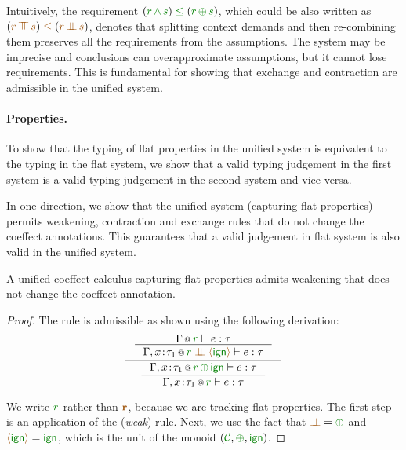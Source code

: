 \noindent
Intuitively, the requirement $(\cclrd{r}\,\czip\,\cclrd{s}) \;\cleq\; (\cclrd{r}\,\cpar\,\cclrd{s})$,
which could be also written as $(\aclrd{r}\,\azip\,\aclrd{s}) \;\aclrd{\leq}\; (\aclrd{r}\,\apar\,\aclrd{s})$,
denotes that splitting context demands and then re-combining them preserves all the requirements
from the assumptions. The system may be imprecise and conclusions can overapproximate assumptions, but
it cannot lose requirements. This is fundamental for showing that exchange and contraction are admissible
in the unified system.

\paragraph{Properties.}
To show that the typing of flat properties in the unified system is equivalent to the typing in the
flat system, we show that a valid typing judgement in the first system is a valid typing judgement in
the second system and vice versa.

In one direction, we show that the unified system (capturing flat properties) permits weakening,
contraction and exchange rules that do not change the coeffect annotations. This guarantees that
a valid judgement in flat system is also valid in the unified system.

\begin{lemma}
\label{thm:further-weak}
A unified coeffect calculus capturing flat properties admits weakening that does not change the
coeffect annotation.
\end{lemma}
\begin{proof}
The rule is admissible as shown using the following derivation:
\begin{equation*}
\inference
  { \inference
      {\coctx{\Gamma}{ \cclrd{r} } \vdash e : \tau}
      {\coctx{\Gamma,x \!:\! \tau_1}{\cclrd{r} \;\apar\; \alift{ \czero }} \vdash e : \tau} }
  { \inference
      {\coctx{\Gamma,x \!:\! \tau_1}{\cclrd{r} \,\cpar\, \czero} \vdash e : \tau}
      {\coctx{\Gamma,x \!:\! \tau_1}{\cclrd{r}} \vdash e : \tau} }
\end{equation*}

\noindent
We write $\cclrd{r}$ rather than $\aclrd{\textbf{r}}$, because we are tracking flat properties.
The first step is an application of the (\emph{weak}) rule. Next, we use the fact that
$\apar=\cpar$ and $\alift{\czero}=\czero$, which is the unit of the monoid $(\C, \cpar, \czero)$.
\end{proof}

